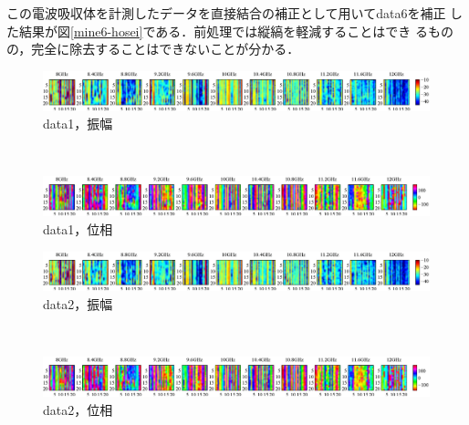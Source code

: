 ﻿\documentclass[12pt,oneside]{jsbook}
\begin{document}
この電波吸収体を計測したデータを直接結合の補正として用いてdata6を補正
した結果が図\ref{mine6-hosei}である．前処理では縦縞を軽減することはでき
るものの，完全に除去することはできないことが分かる．
\begin{figure}[hbtp]
 \begin{center}
     \begin{minipage}[c]{\hsize}
\includegraphics[width = \hsize ]{20150204_mine1_raw_a.eps}
\centering\textmd{data1，振幅}
  \end{minipage}
\\
     \begin{minipage}[c]{\hsize}
\includegraphics[width =\hsize ]{20150204_mine1_raw_p.eps}
\centering\textmd{data1，位相}
  \end{minipage}
\end{center}
\end{figure}
\begin{figure}[bhtp]
 \begin{center}
     \begin{minipage}[c]{\hsize}
\includegraphics[width = \hsize ]{20150204_mine2_raw_a.eps}
\centering\textmd{data2，振幅}
  \end{minipage}
\\
     \begin{minipage}[c]{\hsize}
\includegraphics[width =\hsize ]{20150204_mine2_raw_p.eps}
\centering\textmd{data2，位相}
  \end{minipage}
\end{center}
\end{figure}
\end{document}

